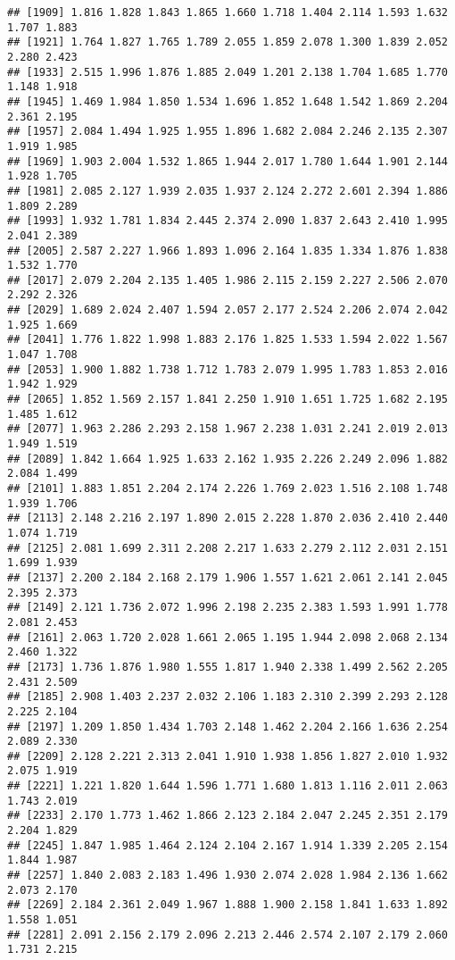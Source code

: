 \documentclass[
]{article}
\begin{document}
\begin{verbatim}
## [1909] 1.816 1.828 1.843 1.865 1.660 1.718 1.404 2.114 1.593 1.632 1.707 1.883
## [1921] 1.764 1.827 1.765 1.789 2.055 1.859 2.078 1.300 1.839 2.052 2.280 2.423
## [1933] 2.515 1.996 1.876 1.885 2.049 1.201 2.138 1.704 1.685 1.770 1.148 1.918
## [1945] 1.469 1.984 1.850 1.534 1.696 1.852 1.648 1.542 1.869 2.204 2.361 2.195
## [1957] 2.084 1.494 1.925 1.955 1.896 1.682 2.084 2.246 2.135 2.307 1.919 1.985
## [1969] 1.903 2.004 1.532 1.865 1.944 2.017 1.780 1.644 1.901 2.144 1.928 1.705
## [1981] 2.085 2.127 1.939 2.035 1.937 2.124 2.272 2.601 2.394 1.886 1.809 2.289
## [1993] 1.932 1.781 1.834 2.445 2.374 2.090 1.837 2.643 2.410 1.995 2.041 2.389
## [2005] 2.587 2.227 1.966 1.893 1.096 2.164 1.835 1.334 1.876 1.838 1.532 1.770
## [2017] 2.079 2.204 2.135 1.405 1.986 2.115 2.159 2.227 2.506 2.070 2.292 2.326
## [2029] 1.689 2.024 2.407 1.594 2.057 2.177 2.524 2.206 2.074 2.042 1.925 1.669
## [2041] 1.776 1.822 1.998 1.883 2.176 1.825 1.533 1.594 2.022 1.567 1.047 1.708
## [2053] 1.900 1.882 1.738 1.712 1.783 2.079 1.995 1.783 1.853 2.016 1.942 1.929
## [2065] 1.852 1.569 2.157 1.841 2.250 1.910 1.651 1.725 1.682 2.195 1.485 1.612
## [2077] 1.963 2.286 2.293 2.158 1.967 2.238 1.031 2.241 2.019 2.013 1.949 1.519
## [2089] 1.842 1.664 1.925 1.633 2.162 1.935 2.226 2.249 2.096 1.882 2.084 1.499
## [2101] 1.883 1.851 2.204 2.174 2.226 1.769 2.023 1.516 2.108 1.748 1.939 1.706
## [2113] 2.148 2.216 2.197 1.890 2.015 2.228 1.870 2.036 2.410 2.440 1.074 1.719
## [2125] 2.081 1.699 2.311 2.208 2.217 1.633 2.279 2.112 2.031 2.151 1.699 1.939
## [2137] 2.200 2.184 2.168 2.179 1.906 1.557 1.621 2.061 2.141 2.045 2.395 2.373
## [2149] 2.121 1.736 2.072 1.996 2.198 2.235 2.383 1.593 1.991 1.778 2.081 2.453
## [2161] 2.063 1.720 2.028 1.661 2.065 1.195 1.944 2.098 2.068 2.134 2.460 1.322
## [2173] 1.736 1.876 1.980 1.555 1.817 1.940 2.338 1.499 2.562 2.205 2.431 2.509
## [2185] 2.908 1.403 2.237 2.032 2.106 1.183 2.310 2.399 2.293 2.128 2.225 2.104
## [2197] 1.209 1.850 1.434 1.703 2.148 1.462 2.204 2.166 1.636 2.254 2.089 2.330
## [2209] 2.128 2.221 2.313 2.041 1.910 1.938 1.856 1.827 2.010 1.932 2.075 1.919
## [2221] 1.221 1.820 1.644 1.596 1.771 1.680 1.813 1.116 2.011 2.063 1.743 2.019
## [2233] 2.170 1.773 1.462 1.866 2.123 2.184 2.047 2.245 2.351 2.179 2.204 1.829
## [2245] 1.847 1.985 1.464 2.124 2.104 2.167 1.914 1.339 2.205 2.154 1.844 1.987
## [2257] 1.840 2.083 2.183 1.496 1.930 2.074 2.028 1.984 2.136 1.662 2.073 2.170
## [2269] 2.184 2.361 2.049 1.967 1.888 1.900 2.158 1.841 1.633 1.892 1.558 1.051
## [2281] 2.091 2.156 2.179 2.096 2.213 2.446 2.574 2.107 2.179 2.060 1.731 2.215

\end{verbatim}
\end{document}
